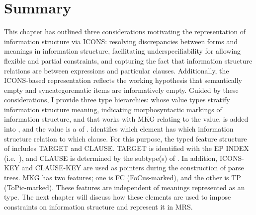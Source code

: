\section{Summary}
\label{9:sec:summary}

This chapter has outlined three considerations motivating the
representation of information structure via ICONS: resolving
discrepancies between forms and meanings in information structure,
facilitating underspecifiability for allowing flexible and partial
constraints, and capturing the fact that
information structure relations are between expressions and particular
clauses.  Additionally, the ICONS-based representation reflects the
working hypothesis that semantically empty and syncategorematic items
are informatively empty.  Guided by these considerations, I provide
three type hierarchies:  whose value types stratify
information structure meaning,  indicating morphosyntactic
markings of information structure, and
 that works with MKG relating to the 
value.  is added
into , and the value is a  of .
 identifies which element has which information structure
relation to which clause. For this purpose, the typed feature
structure of  includes TARGET and
CLAUSE. TARGET is identified with the EP INDEX
(i.e.\ ), and CLAUSE is determined by the subtype(s)
of . In addition, ICONS-KEY and CLAUSE-KEY
are used as pointers during the construction of parse trees.  MKG has
two features; one is FC (FoCus-marked), and the other is TP
(ToPic-marked). These features are independent of meanings represented
as an  type.  The next chapter will discuss how these
elements are used to impose constraints on information structure and
represent it in MRS.























